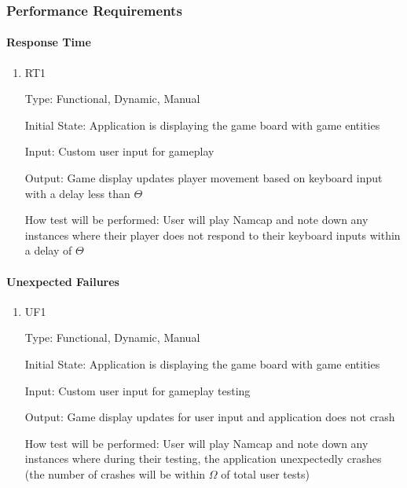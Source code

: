 \documentclass[12pt, titlepage]{article}
\begin{document}
\subsubsection{Performance Requirements}

\paragraph{Response Time}

\begin{enumerate}

\item{RT1\\}

Type: Functional, Dynamic, Manual
					
Initial State: Application is displaying the game board with game entities
					
Input: Custom user input for gameplay
					
Output: Game display updates player movement based on keyboard input with a delay less than $\hyperref[tab:constants]{\Theta}$
					
How test will be performed: User will play Namcap and note down any instances where their player does not respond to their keyboard inputs within a delay of $\hyperref[tab:constants]{\Theta}$

\end{enumerate}

\paragraph{Unexpected Failures}

\begin{enumerate}

\item{UF1\\}

Type: Functional, Dynamic, Manual
					
Initial State: Application is displaying the game board with game entities
					
Input: Custom user input for gameplay testing
					
Output: Game display updates for user input and application does not crash
					
How test will be performed: User will play Namcap and note down any instances where during their testing, the application unexpectedly crashes (the number of crashes will be within $\hyperref[tab:constants]{\Omega}$ of total user tests)

\end{enumerate}
\end{document}
